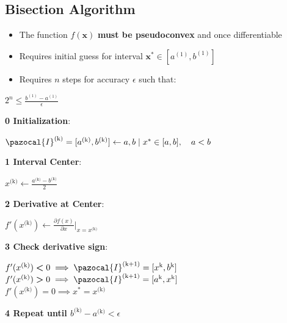 \documentclass[english]{latex4ei/latex4ei_sheet}
\begin{document}
\begin{sectionbox}
	\subsection{Bisection Algorithm}
	\vspace{0.3em}
	\begin{itemize}
		\item The function $f(\bm{x})$ \textbf{must be pseudoconvex} and once differentiable
		\item Requires initial guess for interval $\bm{x}^* \in [a^{(1)}, b^{(1)}]$
		\item Requires $n$ steps for accuracy $\epsilon$ such that:
	\end{itemize}
	\begin{center}
		$2^n \leq \frac{b^{(1)}-a^{(1)}}{\epsilon}$
	\end{center}
	\textbf{0 Initialization}:
	\begin{center}
		$\pazocal{I}^{\text{(k)}} = [a^{\text{(k)}}, b^{\text{(k)}}] \gets a, b \mid x^* \in [a, b], \quad a < b$
	\end{center}
	\textbf{1 Interval Center}:
	\begin{center}
		$x^{\text{(k)}} \gets \frac{a^{\text{(k)}}-b^{\text{(k)}}}{2}$
	\end{center}
	\textbf{2 Derivative at Center}:
	\begin{center}
		$f'(x^\text{(k)}) \gets \frac{\partial f(x)}{\partial x} \bigg\rvert_{x=x^{\text{(k)}}}$
	\end{center}
	\textbf{3 Check derivative sign}:
	\begin{center}
		$f'(x^\text{(k)}) \bm{<} 0 \implies \pazocal{I}^{\text{(k+1)}} = [x^{\text{k}}, b^{\text{k}}]$ \\
		$f'(x^\text{(k)}) \bm{>} 0 \implies \pazocal{I}^{\text{(k+1)}} = [a^{\text{k}}, x^{\text{k}}]$ \\
		$f'(x^\text{(k)}) \bm{=} 0 \implies x^* = x^{\text{(k)}}$
	\end{center}
	\textbf{4 Repeat until $b^{\text{(k)}} - a^{\text{(k)}} < \epsilon$}
	
\end{sectionbox}
\end{document}
